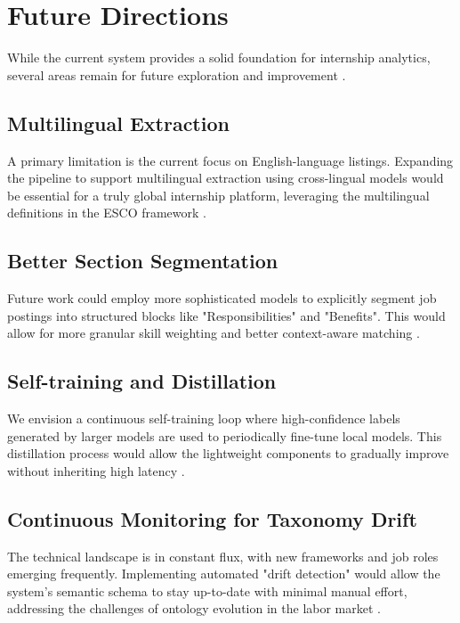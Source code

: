 \section{Future Directions}
While the current system provides a solid foundation for internship analytics, several areas remain for future exploration and improvement \cite{tamburri2020data, lacic2020recommender}.

\subsection{Multilingual Extraction}
A primary limitation is the current focus on English-language listings. Expanding the pipeline to support multilingual extraction using cross-lingual models would be essential for a truly global internship platform, leveraging the multilingual definitions in the ESCO framework \cite{esco2017handbook, lin2021pretrained}.

\subsection{Better Section Segmentation}
Future work could employ more sophisticated models to explicitly segment job postings into structured blocks like "Responsibilities" and "Benefits". This would allow for more granular skill weighting and better context-aware matching \cite{qin2018enhancing, bhola2020retrieving}.

\subsection{Self-training and Distillation}
We envision a continuous self-training loop where high-confidence labels generated by larger models are used to periodically fine-tune local models. This distillation process would allow the lightweight components to gradually improve without inheriting high latency \cite{hsieh2023distilling, sanh2019distilbert}.

\subsection{Continuous Monitoring for Taxonomy Drift}
The technical landscape is in constant flux, with new frameworks and job roles emerging frequently. Implementing automated "drift detection" would allow the system's semantic schema to stay up-to-date with minimal manual effort, addressing the challenges of ontology evolution in the labor market \cite{shvaiko2013ontology, staab2009handbook}.
